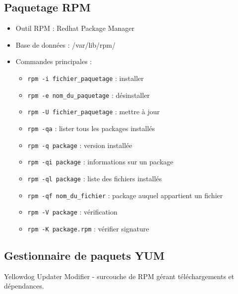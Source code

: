 \documentclass[12pt,a4paper]{article}
\begin{document}
\subsection{Paquetage RPM}
\begin{itemize}
    \item Outil RPM : Redhat Package Manager %
    \item Base de donn\'ees : /var/lib/rpm/ %
    \item Commandes principales :
    \begin{itemize}
        \item \texttt{rpm -i fichier\_paquetage} : installer %
        \item \texttt{rpm -e nom\_du\_paquetage} : d\'esinstaller %
        \item \texttt{rpm -U fichier\_paquetage} : mettre \`a jour %
        \item \texttt{rpm -qa} : lister tous les packages install\'es %
        \item \texttt{rpm -q package} : version install\'ee %
        \item \texttt{rpm -qi package} : informations sur un package %
        \item \texttt{rpm -ql package} : liste des fichiers install\'es %
        \item \texttt{rpm -qf nom\_du\_fichier} : package auquel appartient un fichier %
        \item \texttt{rpm -V package} : v\'erification %
        \item \texttt{rpm -K package.rpm} : v\'erifier signature %
    \end{itemize}
\end{itemize}


\subsection{Gestionnaire de paquets YUM}
Yellowdog Updater Modifier - surcouche de RPM g\'erant t\'el\'echargements et d\'ependances.
\end{document}
